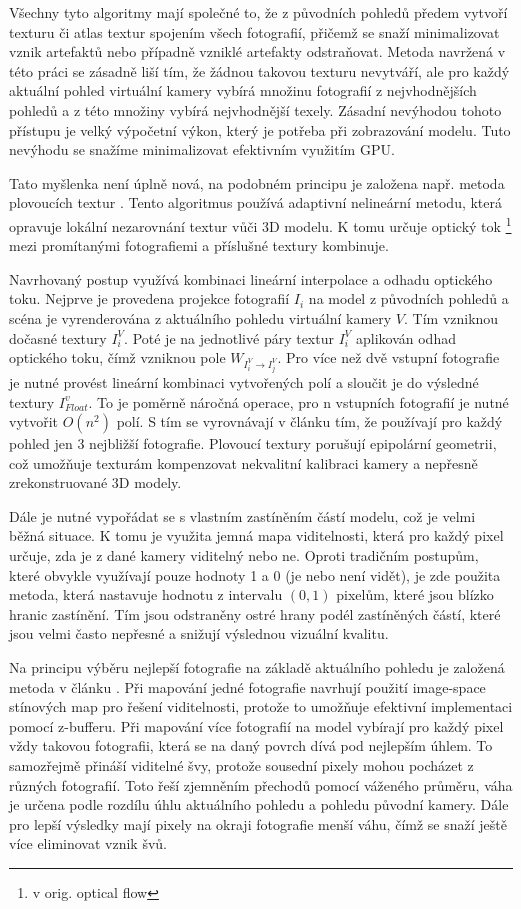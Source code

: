 \documentclass[11pt,twoside,a4paper]{book}
\begin{document}
Všechny tyto algoritmy mají společné to, že z původních pohledů předem vytvoří
texturu či atlas textur spojením všech fotografií, přičemž se snaží
minimalizovat vznik artefaktů nebo případně vzniklé artefakty odstraňovat.
Metoda navržená v této práci se zásadně liší tím, že žádnou takovou texturu
nevytváří, ale pro každý aktuální pohled virtuální kamery vybírá množinu
fotografií z nejvhodnějších pohledů a z této množiny vybírá nejvhodnější texely.
Zásadní nevýhodou tohoto přístupu je velký výpočetní výkon, který je potřeba při
zobrazování modelu. Tuto nevýhodu se snažíme minimalizovat efektivním využitím
GPU.

Tato myšlenka není úplně nová, na podobném principu je založena např. metoda
plovoucích textur \cite{floating-textures}. Tento algoritmus používá adaptivní
nelineární metodu, která opravuje lokální nezarovnání textur vůči 3D modelu. K
tomu určuje optický tok \footnote{v orig. optical flow} mezi promítanými fotografiemi a
příslušné textury kombinuje.

Navrhovaný postup využívá kombinaci lineární interpolace a odhadu optického
toku. Nejprve je provedena projekce fotografií $I_i$ na model z původních
pohledů a scéna je vyrenderována z aktuálního pohledu virtuální kamery $V$. Tím
vzniknou dočasné textury $I_i^V$. Poté je na jednotlivé páry textur $I_i^V$
aplikován odhad optického toku, čímž vzniknou pole $W_{I_i^V \rightarrow
I_j^V}$. Pro více než dvě vstupní fotografie je nutné provést lineární kombinaci
vytvořených polí a sloučit je do výsledné textury $I^v_{Float}$. To je poměrně náročná operace, pro n vstupních fotografií je nutné vytvořit $O(n^2)$ polí. S tím se vyrovnávají v článku tím, že používají pro každý pohled jen 3 nejbližší fotografie. Plovoucí textury porušují epipolární geometrii, což umožňuje texturám kompenzovat nekvalitní kalibraci kamery a nepřesně zrekonstruované 3D modely.

Dále je nutné vypořádat se s vlastním zastíněním částí modelu, což je velmi
běžná situace. K tomu je využita jemná mapa viditelnosti, která pro každý pixel
určuje, zda je z dané kamery viditelný nebo ne. Oproti tradičním postupům, které
obvykle využívají pouze hodnoty 1 a 0 (je nebo není vidět), je zde použita
metoda, která nastavuje hodnotu z intervalu $(0,1)$ pixelům, které jsou blízko
hranic zastínění. Tím jsou odstraněny ostré hrany podél zastíněných částí, které
jsou velmi často nepřesné a snižují výslednou vizuální kvalitu.

Na principu výběru nejlepší fotografie na základě aktuálního pohledu je založená metoda v článku \cite{Debevec96}. Při mapování jedné fotografie navrhují použití image-space stínových map pro řešení viditelnosti, protože to umožňuje efektivní implementaci pomocí z-bufferu. Při mapování více fotografií na model vybírají pro každý pixel vždy takovou fotografii, která se na daný povrch dívá pod nejlepším úhlem. To samozřejmě přináší viditelné švy, protože sousední pixely mohou pocházet z různých fotografií. Toto řeší zjemněním přechodů pomocí váženého průměru, váha je určena podle rozdílu úhlu aktuálního pohledu a pohledu původní kamery. Dále pro lepší výsledky mají pixely na okraji fotografie menší váhu, čímž se snaží ještě více eliminovat vznik švů.
\end{document}
